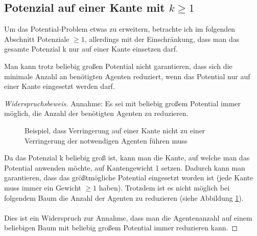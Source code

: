 \subsection{Potenzial auf einer Kante mit $k \geq 1$}


Um das Potential-Problem etwas zu erweitern, betrachte ich im folgenden Abschnitt Potenziale $\geq 1$, allerdings mit der Einschränkung, dass man das gesamte Potenzial k nur auf einer Kante einsetzen darf.

\begin{theorem}
	Man kann trotz beliebig großen Potential nicht garantieren, dass sich die minimale Anzahl an benötigten Agenten reduziert, wenn das Potential nur auf einer Kante eingesetzt werden darf.
\end{theorem}

\begin{proof}[Widerspruchsbeweis]
	Annahme: Es sei mit beliebig großem Potential immer möglich, die Anzahl der benötigten Agenten zu reduzieren.
	
	\begin{figure}[hbt]

		\caption{Beispiel, dass Verringerung auf einer Kante nicht zu einer Verringerung der notwendigen Agenten führen muss} 
		\label{abb_gegenbeispielMaxPotential}
	\end{figure} 
	
	
	Da das Potenzial k beliebig groß ist, kann man die Kante, auf welche man das Potential anwenden möchte, auf Kantengewicht 1 setzen. Dadurch kann man garantieren, dass das größtmögliche Potential eingesetzt worden ist (jede Kante muss immer ein Gewicht $\geq 1$ haben). Trotzdem ist es nicht möglich bei folgendem Baum die Anzahl der Agenten zu reduzieren (siehe Abbildung \ref{abb_gegenbeispielMaxPotential}).
	\\
	\\
	Dies ist ein Widerspruch zur Annahme, dass man die Agentenanzahl auf einem beliebigen Baum mit beliebig großem Potential immer reduzieren kann.
\end{proof}

